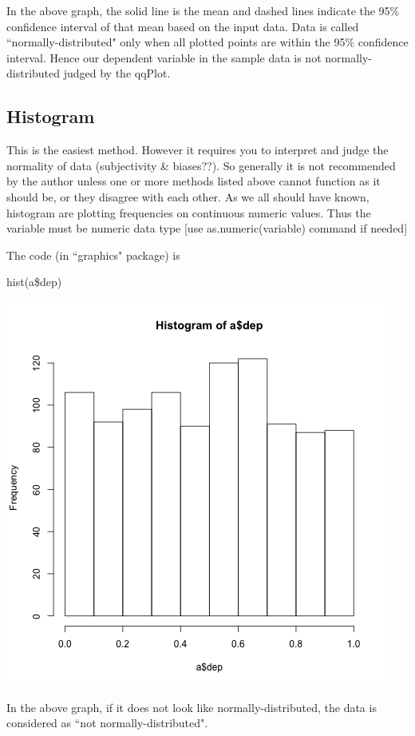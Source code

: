 \documentclass[../note.tex]{subfiles} %
\begin{document}
In the above graph, the solid line is the mean and dashed lines indicate the 95\% confidence interval of that mean based on the input data.  Data is called ``normally-distributed" only when all plotted points are within the 95\% confidence interval.  Hence our dependent variable in the sample data is not normally-distributed judged by the qqPlot.

\subsection{Histogram}
This is the easiest method. However it requires you to interpret and judge the normality of data (subjectivity \& biases??).  So generally it is not recommended by the author unless one or more methods listed above cannot function as it should be, or they disagree with each other.  As we all should have known, histogram are plotting frequencies on continuous numeric values.  Thus the variable must be numeric data type [use as.numeric(variable) command if needed]

The code (in ``graphics" package\autocite{Rcore}) is
\begin{code}
hist(a\$dep)
\end{code}
\begin{center}
    \includegraphics[width=.5\linewidth]{../graph/histogram.png}
\end{center}

In the above graph, if it does not look like normally-distributed, the data is considered as ``not normally-distributed".
\end{document}
